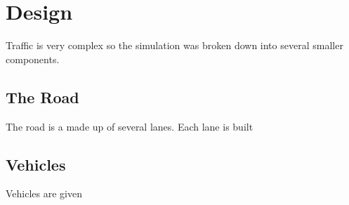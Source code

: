 \section{Design}

\par
Traffic is very complex so the simulation was broken down into several smaller components.

\subsection{The Road}
The road is a made up of several lanes. Each lane is built 

\subsection{Vehicles}
\par
Vehicles are given 


